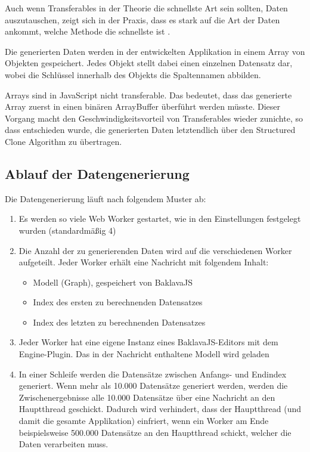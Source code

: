 Auch wenn Transferables in der Theorie die schnellste Art sein sollten, Daten auszutauschen, zeigt sich in der Praxis, dass es stark auf die Art der Daten ankommt, welche Methode die schnellste ist \cite{transferables1, transferables2, transferables3}.

Die generierten Daten werden in der entwickelten Applikation in einem Array von Objekten gespeichert. Jedes Objekt stellt dabei einen einzelnen Datensatz dar, wobei die Schlüssel innerhalb des Objekts die Spaltennamen abbilden.

Arrays sind in JavaScript nicht transferable. Das bedeutet, dass das generierte Array zuerst in einen binären ArrayBuffer überführt werden müsste. Dieser Vorgang macht den Geschwindigkeitsvorteil von Transferables wieder zunichte, so dass entschieden wurde, die generierten Daten letztendlich über den Structured Clone Algorithm zu übertragen.

\subsection{Ablauf der Datengenerierung}

Die Datengenerierung läuft nach folgendem Muster ab:

\begin{enumerate}
    \item Es werden so viele Web Worker gestartet, wie in den Einstellungen festgelegt wurden (standardmäßig 4)
    \item Die Anzahl der zu generierenden Daten wird auf die verschiedenen Worker aufgeteilt. Jeder Worker erhält eine Nachricht mit folgendem Inhalt:
    \begin{itemize}
        \item Modell (Graph), gespeichert von BaklavaJS
        \item Index des ersten zu berechnenden Datensatzes
        \item Index des letzten zu berechnenden Datensatzes
    \end{itemize}
    \item Jeder Worker hat eine eigene Instanz eines BaklavaJS-Editors mit dem Engine-Plugin. Das in der Nachricht enthaltene Modell wird geladen
    \item In einer Schleife werden die Datensätze zwischen Anfangs- und Endindex generiert. Wenn mehr als 10.000 Datensätze generiert werden, werden die Zwischenergebnisse alle 10.000 Datensätze über eine Nachricht an den Hauptthread geschickt. Dadurch wird verhindert, dass der Hauptthread (und damit die gesamte Applikation) einfriert, wenn ein Worker am Ende beispielsweise 500.000 Datensätze an den Hauptthread schickt, welcher die Daten verarbeiten muss.
\end{enumerate}

